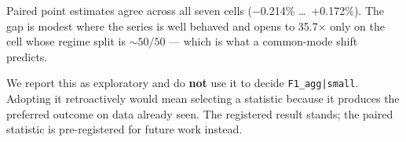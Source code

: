 \documentclass[sigconf,review,anonymous]{acmart}
\newcommand{\cell}[1]{\texttt{#1}}
\begin{document}
Paired point estimates agree across all seven cells (−0.214\% \ldots\ +0.172\%). The gap is modest where
the series is well behaved and opens to 35.7× only on the cell whose regime split is ${\sim}50/50$ ---
which is what a common-mode shift predicts.

We report this as exploratory and do \textbf{not} use it to decide \cell{F1\_agg|small}. Adopting it
retroactively would mean selecting a statistic because it produces the preferred outcome on data
already seen. The registered result stands; the paired statistic is pre-registered for future
work instead.
\end{document}
